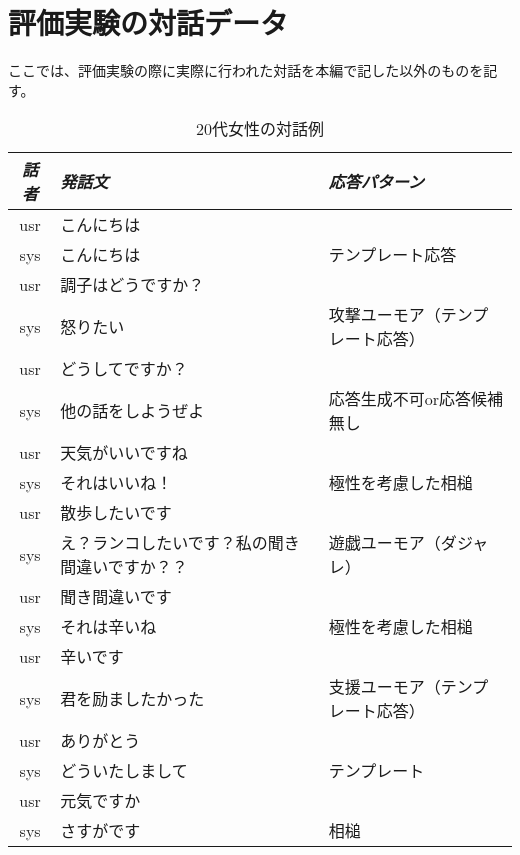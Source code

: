 \chapter{評価実験の対話データ}
ここでは、評価実験の際に実際に行われた対話を本編で記した以外のものを記す。

\begin{longtable}{| c | p{} | p{}|}
\caption{20代女性の対話例}
\endhead
\hline
{\em 話者} & {\em 発話文} & {\em 応答パターン}\\
\hline
\hline
usr & こんにちは & \\
sys & こんにちは & テンプレート応答\\
usr & 調子はどうですか？ & \\
sys & 怒りたい & 攻撃ユーモア（テンプレート応答）\\
usr & どうしてですか？ & \\
sys & 他の話をしようぜよ & 応答生成不可or応答候補無し\\
usr & 天気がいいですね & \\
sys & それはいいね！ & 極性を考慮した相槌\\
usr & 散歩したいです & \\
sys & え？ランコしたいです？私の聞き間違いですか？？ & 遊戯ユーモア（ダジャレ）\\
usr & 聞き間違いです & \\
sys & それは辛いね & 極性を考慮した相槌\\
usr & 辛いです & \\
sys & 君を励ましたかった & 支援ユーモア（テンプレート応答）\\
usr & ありがとう & \\
sys & どういたしまして & テンプレート\\
usr & 元気ですか & \\
sys & さすがです & 相槌\\
\hline
\end{longtable}


